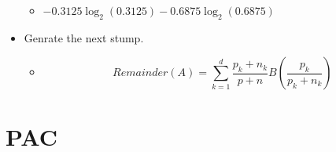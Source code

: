\documentclass[compress, 9pt]{beamer}
\begin{document}
\begin{frame}
\begin{itemize}
\begin{itemize}
\item <4-> $-0.3125\log_2(0.3125) - 0.6875\log_2(0.6875)$
\label{sec-3-3-2-1}%
\end{itemize} %

\item <5-> Genrate the next stump.
\label{sec-3-3-3}%
\begin{itemize}

\item <6-> \[Remainder(A)= \sum_{k=1}^{d}\frac{p_k+n_k}{p+n}B(\frac{p_k}{p_k+n_k})\]
\label{sec-3-3-3-1}%
\end{itemize} %
\end{itemize} %
\end{frame}
\section{PAC}
\label{sec-4}
\end{document}
